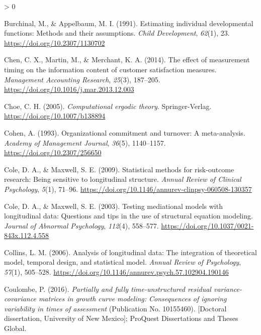 \documentclass[
12pt, %
twoside,
english]{guelphthesis}
\newlength{\cslhangindent}
\newenvironment{CSLReferences}[2] %
 {%
  \setlength{\parindent}{0pt}
  \ifodd #1 \everypar{\setlength{\hangindent}{\cslhangindent}}\ignorespaces\fi
  \ifnum #2 > 0
  \setlength{\parskip}{\linespacing{2}}
  \fi
 }%
 {}
\theoremstyle{definition}
\theoremstyle{definition}
\theoremstyle{definition}
\theoremstyle{definition}
\theoremstyle{remark}
\begin{document}
\begin{CSLReferences}{1}{0}
\leavevmode{}%
Burchinal, M., \& Appelbaum, M. I. (1991). Estimating individual developmental functions: Methods and their assumptions. \emph{Child Development}, \emph{62}(1), 23. \url{https://doi.org/10.2307/1130702}

\leavevmode{}%
Chen, C. X., Martin, M., \& Merchant, K. A. (2014). The effect of measurement timing on the information content of customer satisfaction measures. \emph{Management Accounting Research}, \emph{25}(3), 187--205. \url{https://doi.org/10.1016/j.mar.2013.12.003}

\leavevmode{}%
Choe, C. H. (2005). \emph{Computational ergodic theory}. Springer-Verlag. \url{https://doi.org/10.1007/b138894}

\leavevmode{}%
Cohen, A. (1993). Organizational commitment and turnover: A meta-analysis. \emph{Academy of Management Journal}, \emph{36}(5), 1140--1157. \url{https://doi.org/10.2307/256650}

\leavevmode{}%
Cole, D. A., \& Maxwell, S. E. (2009). Statistical methods for risk-outcome research: Being sensitive to longitudinal structure. \emph{Annual Review of Clinical Psychology}, \emph{5}(1), 71--96. \url{https://doi.org/10.1146/annurev-clinpsy-060508-130357}

\leavevmode{}%
Cole, D. A., \& Maxwell, S. E. (2003). Testing mediational models with longitudinal data: Questions and tips in the use of structural equation modeling. \emph{Journal of Abnormal Psychology}, \emph{112}(4), 558--577. \url{https://doi.org/10.1037/0021-843x.112.4.558}

\leavevmode{}%
Collins, L. M. (2006). Analysis of longitudinal data: The integration of theoretical model, temporal design, and statistical model. \emph{Annual Review of Psychology}, \emph{57}(1), 505--528. \url{https://doi.org/10.1146/annurev.psych.57.102904.190146}

\leavevmode{}%
Coulombe, P. (2016). \emph{Partially and fully time-unstructured residual variance-covariance matrices in growth curve modeling: Consequences of ignoring variability in times of assessment} (Publication No. 10155460). {[}Doctoral dissertation, University of New Mexico{]}; {ProQuest Dissertations and Theses Global.}


\end{CSLReferences}
\end{document}
